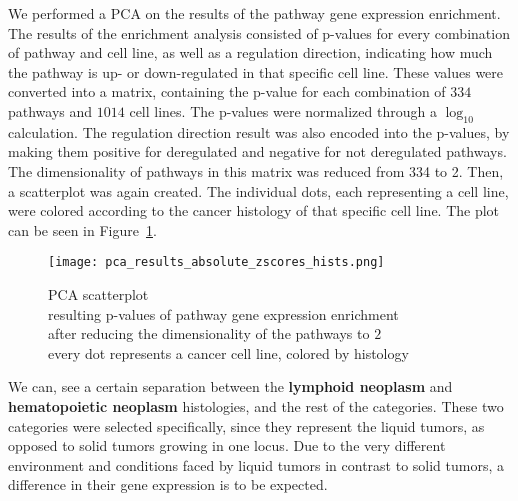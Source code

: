 We performed a PCA on the results of the pathway gene expression enrichment. The results of the enrichment analysis consisted of p-values for every combination of pathway and cell line, as well as a regulation direction, indicating how much the pathway is up- or down-regulated in that specific cell line. These values were converted into a matrix, containing the p-value for each combination of $334$ pathways and $1014$ cell lines. The p-values were normalized through a $\log_{10}$ calculation. The regulation direction result was also encoded into the p-values, by making them positive for deregulated and negative for not deregulated pathways. The dimensionality of pathways in this matrix was reduced from 334 to 2. Then, a scatterplot was again created. The individual dots, each representing a cell line, were colored according to the cancer histology of that specific cell line. The plot can be seen in Figure~\ref{fig:pca_enr2}.\\
\begin{figure}
    \texttt{[image: pca\_results\_absolute\_zscores\_hists.png]}
    \caption{PCA scatterplot\\resulting p-values of pathway gene expression enrichment\\after reducing the dimensionality of the pathways to $2$\\every dot represents a cancer cell line, colored by histology}
    \label{fig:pca_enr2}
\end{figure}
We can, see a certain separation between the \textbf{lymphoid neoplasm} and \textbf{hematopoietic neoplasm} histologies, and the rest of the categories. These two categories were selected specifically, since they represent the liquid tumors, as opposed to solid tumors growing in one locus. Due to the very different environment and conditions faced by liquid tumors in contrast to solid tumors, a difference in their gene expression is to be expected.

